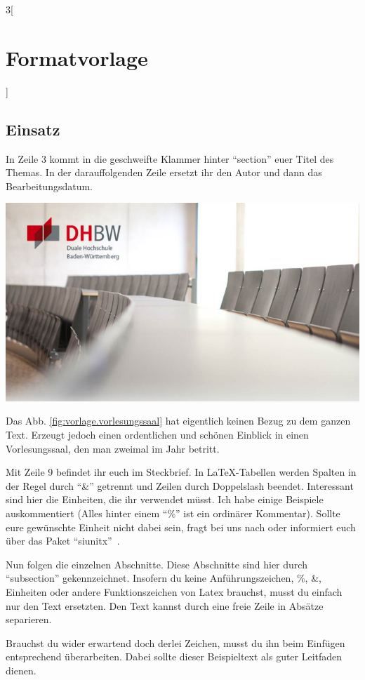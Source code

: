 \begin{multicols}{3}[\section{Formatvorlage}]
\subsection*{Einsatz}
In Zeile 3 kommt in die geschweifte Klammer hinter \enquote{section} euer Titel des Themas. In der darauffolgenden Zeile ersetzt ihr den Autor und dann das Bearbeitungsdatum.
\begin{Figure}
\includegraphics[width=\linewidth]{Kapitel/Vorlage/Grafiken/bild2_dhbw.jpg}
\label{fig:vorlage.vorlesungssaal}
\end{Figure}
Das Abb. \ref{fig:vorlage.vorlesungssaal} hat eigentlich keinen Bezug zu dem ganzen Text. Erzeugt jedoch einen ordentlichen und schönen Einblick in einen Vorlesungssaal, den man zweimal im Jahr betritt.

Mit Zeile 9 befindet ihr euch im Steckbrief. In \LaTeX-Tabellen werden Spalten in der Regel durch \enquote{\&} getrennt und Zeilen durch Doppelslash beendet. Interessant sind hier die Einheiten, die ihr verwendet müsst. Ich habe einige Beispiele auskommentiert (Alles hinter einem \enquote{\%} ist ein ordinärer Kommentar). Sollte eure gewünschte Einheit nicht dabei sein, fragt bei uns nach oder informiert euch über das Paket \enquote{siunitx}~\cite{vorlage.1}.

Nun folgen die einzelnen Abschnitte. Diese Abschnitte sind hier durch \enquote{subsection} gekennzeichnet. Insofern du keine Anführungszeichen, \%, \&, Einheiten oder andere Funktionszeichen von Latex brauchst, musst du einfach nur den Text ersetzten. Den Text kannst durch eine freie Zeile in Absätze separieren. 

Brauchst du wider erwartend doch derlei Zeichen, musst du ihn beim Einfügen entsprechend überarbeiten. Dabei sollte dieser Beispieltext als guter Leitfaden dienen.


\end{multicols}
